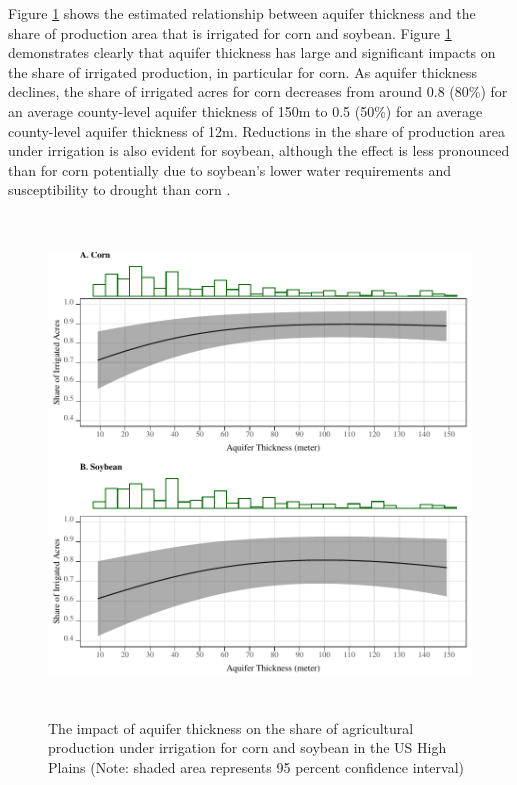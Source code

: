 \documentclass[
]{article}
\begin{document}
Figure \ref{fig:ir-share} shows the estimated relationship between aquifer thickness and the share of production area that is irrigated for corn and soybean. Figure \ref{fig:ir-share} demonstrates clearly that aquifer thickness has large and significant impacts on the share of irrigated production, in particular for corn. As aquifer thickness declines, the share of irrigated acres for corn decreases from around 0.8 (80\%) for an average county-level aquifer thickness of 150m to 0.5 (50\%) for an average county-level aquifer thickness of 12m. Reductions in the share of production area under irrigation is also evident for soybean, although the effect is less pronounced than for corn potentially due to soybean's lower water requirements and susceptibility to drought than corn \citep{zipper2016drought, ruess2022irrigation}.

\begin{figure}[H]

{\centering \includegraphics[width=5in,height=500px,]{Figures/g_share} 

}

\caption{The impact of aquifer thickness on the share of agricultural production under irrigation for corn and soybean in the US High Plains (Note: shaded area represents 95 percent confidence interval)}\label{fig:ir-share}
\end{figure}
\end{document}
